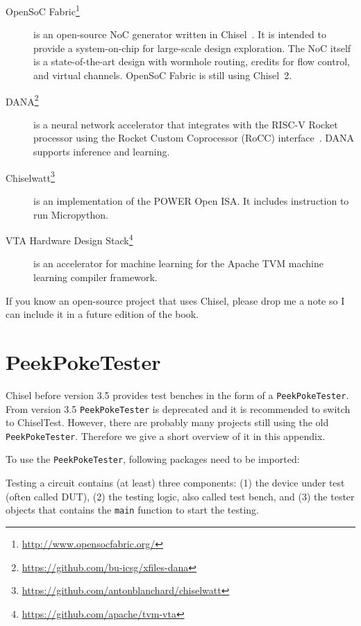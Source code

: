 \documentclass[%
    10pt,
    headinclude, footexclude,
    openright, %
    notitlepage,
    cleardoubleempty,
    headsepline,
    pointlessnumbers,
    bibtotoc, idxtotoc,
    ]{scrbook}
\newcommand{\code}[1]{{\small{\texttt{#1}}}}
\newcommand{\myref}[2]{\href{#1}{#2}}
\renewcommand{\myref}[2]{{#2}{\footnote{\url{#1}}}}
\begin{document}
\begin{description}
\item[\myref{http://www.opensocfabric.org/}{OpenSoC Fabric}] is an open-source NoC
generator written in Chisel~\cite{OpenSoC:ispass2016}. It is intended to provide a
system-on-chip for large-scale design exploration. The NoC itself is a state-of-the-art design with wormhole routing, credits for flow control, and virtual channels.
OpenSoC Fabric is still using Chisel~2.

\item[\myref{https://github.com/bu-icsg/xfiles-dana}{DANA}] is a neural network accelerator
that integrates with the RISC-V Rocket processor using the Rocket Custom Coprocessor (RoCC) interface~\cite{RoCC:2015}.
DANA supports inference and learning.

\item[\myref{https://github.com/antonblanchard/chiselwatt}{Chiselwatt}] is an implementation
of the POWER Open ISA. It includes instruction to run Micropython.

\item[\myref{https://github.com/apache/tvm-vta}{VTA Hardware Design Stack}] is an accelerator for
machine learning for the Apache TVM machine learning compiler framework.

\end{description}

If you know an open-source project that uses Chisel, please drop me a note
so I can include it in a future edition of the book.


\chapter{PeekPokeTester}
\label{chap:peekpoke}

Chisel before version 3.5 provides test benches in the form of a \code{PeekPokeTester}.
From version 3.5 \code{PeekPokeTester} is deprecated and it is recommended to
switch to ChiselTest. However, there are probably many projects still using
the old \code{PeekPokeTester}. Therefore we give a short overview of it in this
appendix. 

To use the \code{PeekPokeTester}, following packages need to be imported:


\noindent Testing a circuit contains (at least) three components: (1) the device under test (often
called DUT), (2) the testing logic, also called test bench, and (3) the tester objects
that contains the \code{main} function to start the testing.
\end{document}
